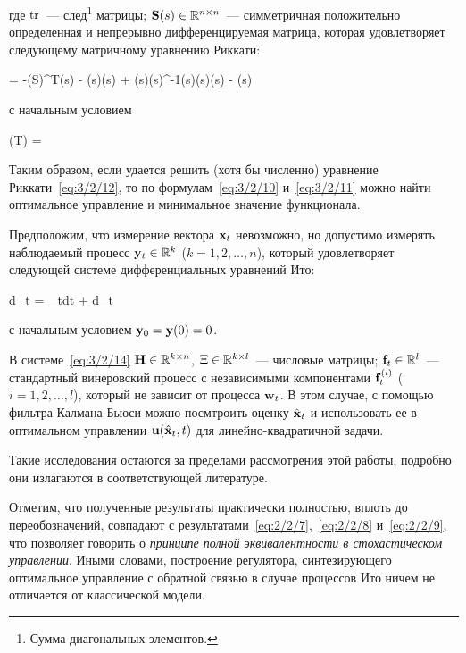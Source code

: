 где $\operatorname{\mathrm{tr}}$~--- след\footnote{ Сумма диагональных элементов. } матрицы; $\mathbf{S}(s) \in \mathbb{R}^{{n} \times {n}}$~--- симметричная положительно определенная и непрерывно дифференцируемая матрица, которая удовлетворяет следующему матричному уравнению Риккати:

	 = -(S)^T(s) - (s)(s) + (s)(s)^{-1}(s)(s)(s) - (s)
\eeq

с начальным условием

	(T) =  
\eeq

Таким образом, если удается решить (хотя бы численно) уравнение Риккати~\ref{eq:3/2/12}, то по формулам~\ref{eq:3/2/10} и~\ref{eq:3/2/11} можно найти оптимальное управление и минимальное значение функционала.

\br

Предположим, что измерение вектора $\mathbf{x}_t$ невозможно, но допустимо измерять наблюдаемый процесс $\mathbf{y}_t \in \mathbb{R}^{k}$ ($k = 1, 2, \ldots, n$), который удовлетворяет следующей системе дифференциальных уравнений Ито:

	d_t = _tdt + \Xi d_t
\eeq

с начальным условием $\mathbf{y}_0 = \mathbf{y}(0) = 0$.

В системе~\ref{eq:3/2/14} $\mathbf{H} \in \mathbb{R}^{{k} \times {n}}$, $\Xi \in \mathbb{R}^{{k} \times {l}}$~--- числовые матрицы; $\mathbf{f}_t \in \mathbb{R}^{l}$~--- стандартный винеровский процесс с независимыми компонентами $\mathbf{f}^{(i)}_t$ ($i = 1, 2, \ldots, l$), который не зависит от процесса $\mathbf{w}_t$. В этом случае, с помощью фильтра Калмана-Бьюси можно посмтроить оценку $\hat{\mathbf{x}}_t$ и использовать ее в оптимальном управлении $\mathbf{u}(\hat{\mathbf{x}}_t, t)$ для линейно-квадратичной задачи.

Такие исследования остаются за пределами рассмотрения этой работы, подробно они излагаются в соответствующей литературе\cite{KLOEDEN}.

\br

Отметим, что полученные результаты практически полностью, вплоть до переобозначений, совпадают с результатами~\ref{eq:2/2/7},~\ref{eq:2/2/8} и~\vref{eq:2/2/9}, что позволяет говорить о \emph{принципе полной эквивалентности в стохастическом управлении}. Иными словами, построение регулятора, синтезирующего оптимальное управление с обратной связью в случае процессов Ито ничем не отличается от классической модели.



